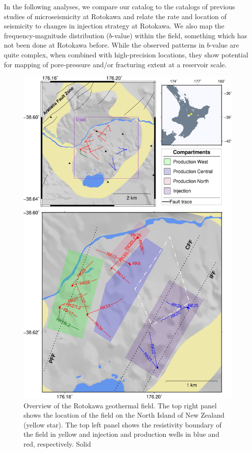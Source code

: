 In the following analyses, we compare our catalog to the catalogs of previous studies of microseismicity at Rotokawa \citep{Sewell_2015WGC,Sherburn_2015} and relate the rate and location of seismicity to changes in injection strategy at Rotokawa. We also map the frequency-magnitude distribution ($b$-value) within the field, something which has not been done at Rotokawa before. While the observed patterns in $b$-value are quite complex, when combined with high-precision locations, they show potential for mapping of pore-pressure and/or fracturing extent at a reservoir scale.

\begin{figure}[p]
\begin{center}
\includegraphics[width=0.75\columnwidth,height=\textheight,keepaspectratio]{Chapter_4_Rot/figures/merc_Rot_overview_inset/merc_Rot_overview_struct_inset_NI_compartments}
\caption[Overview of the Rotokawa geothermal field]{{
Overview of the Rotokawa geothermal field. The top right panel shows the
location of the field on the North Island of New Zealand (yellow star).
The top left panel shows the resistivity boundary of the field in yellow
and injection and production wells in blue and red, respectively. Solid
}}
\end{center}
\end{figure}
